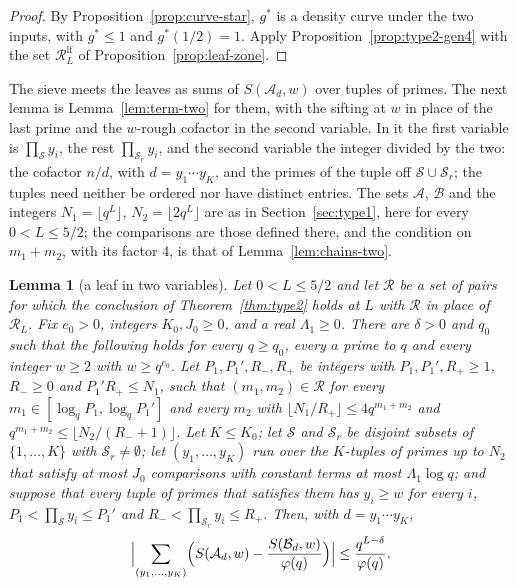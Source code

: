 \documentclass[11pt]{article}
\newtheorem{lemma}[theorem]{Lemma}
\theoremstyle{definition}
\begin{document}
\begin{proof}
By Proposition~\ref{prop:curve-star}, $g^*$ is a density curve under the two inputs, with $g^* \le 1$ and $g^*(1/2) =
1$. Apply Proposition~\ref{prop:type2-gen4} with the set $\mathcal R^{\mathrm{lf}}_L$ of
Proposition~\ref{prop:leaf-zone}.
\end{proof}

The sieve meets the leaves as sums of $S(\mathcal A_d, w)$ over tuples of primes. The next lemma is
Lemma~\ref{lem:term-two} for them, with the sifting at $w$ in place of the last prime and the $w$-rough cofactor in the
second variable. In it the first variable is $\prod_{\mathcal S} y_i$, the rest $\prod_{\mathcal S_r} y_i$, and the
second variable the integer divided by the two: the cofactor $n/d$, with $d = y_1 \cdots y_K$, and the primes of the
tuple off $\mathcal S \cup \mathcal S_r$; the tuples need neither be ordered nor have distinct entries. The sets
$\mathcal A$, $\mathcal B$ and the integers $N_1 = \lfloor q^L \rfloor$, $N_2 = \lfloor 2q^L \rfloor$ are as in
Section~\ref{sec:type1}, here for every $0 < L \le 5/2$; the comparisons are those defined there, and the condition on
$m_1 + m_2$, with its factor $4$, is that of Lemma~\ref{lem:chains-two}.

\begin{lemma}[a leaf in two variables]\label{lem:leaf-term}
Let $0 < L \le 5/2$ and let $\mathcal R$ be a set of pairs for which the conclusion of Theorem~\ref{thm:type2} holds
at $L$ with $\mathcal R$ in place of $\mathcal R_L$. Fix $e_0 > 0$, integers $K_0, J_0 \ge 0$, and a real $\Lambda_1
\ge 0$. There are $\delta > 0$ and $q_0$ such that the following holds for every $q \ge q_0$, every $a$ prime to $q$
and every integer $w \ge 2$ with $w \ge q^{e_0}$. Let $P_1, P_1', R_-, R_+$ be integers with $P_1, P_1', R_+ \ge 1$,
$R_- \ge 0$ and $P_1' R_+ \le N_1$, such that $(m_1, m_2) \in \mathcal R$ for every $m_1 \in [\log_q P_1, \log_q
P_1']$ and every $m_2$ with $\lfloor N_1/R_+ \rfloor \le 4q^{m_1 + m_2}$ and $q^{m_1 + m_2} \le \lfloor N_2/(R_- + 1)
\rfloor$. Let $K \le K_0$; let $\mathcal S$ and $\mathcal S_r$ be disjoint subsets of $\{1, \dots, K\}$ with $\mathcal
S_r \ne \emptyset$; let $(y_1, \dots, y_K)$ run over the $K$-tuples of primes up to $N_2$ that satisfy at most $J_0$
comparisons with constant terms at most $\Lambda_1 \log q$; and suppose that every tuple of primes that satisfies them
has $y_i \ge w$ for every $i$, $P_1 < \prod_{\mathcal S} y_i \le P_1'$ and $R_- < \prod_{\mathcal S_r} y_i \le R_+$.
Then, with $d = y_1 \cdots y_K$,
\[
  \Bigl|\sum_{(y_1, \dots, y_K)} \Bigl(S(\mathcal A_d, w) - \frac{S(\mathcal B_d, w)}{\varphi(q)}\Bigr)\Bigr|
  \le \frac{q^{L - \delta}}{\varphi(q)}.
\]
\end{lemma}
\end{document}

